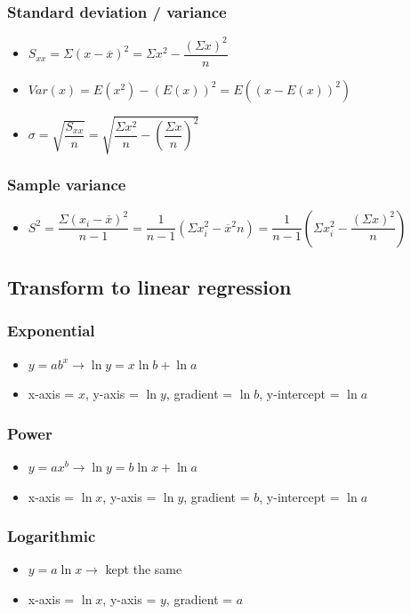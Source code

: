 \documentclass[A4paper, 11pt]{article}
\begin{document}
	\subsubsection{Standard deviation / variance}
	\begin{itemize}
		\item $S_{xx}=\Sigma (x-\overline{x})^2=\Sigma x^2 - \dfrac{(\Sigma x)^2}{n}$
		\item $Var(x)=E(x^2)-(E(x))^2=E((x- E(x) )^2)$
		\item $\sigma=\sqrt{\dfrac{S_{xx}}{n}}=\sqrt{\dfrac{\Sigma x^2}{n} - (\dfrac{\Sigma x}{n})^2}$
	\end{itemize}
	
	\subsubsection{Sample variance}
	\begin{itemize}
		\item $S^2=\dfrac{\Sigma(x_i-\overline{x})^2}{n-1}=\dfrac{1}{n-1}(\Sigma x_i^2-\overline{x}^2n)=\dfrac{1}{n-1}(\Sigma x_i^2-\dfrac{(\Sigma x)^2}{n})$
	\end{itemize}

	
	\subsection{Transform to linear regression}
	\subsubsection{Exponential}
	\begin{itemize}
		\item $y=ab^x\rightarrow\ln y = x\ln b + \ln a$
		\item x-axis = $x$, y-axis = $\ln y$, gradient = $\ln b$, y-intercept = $\ln a$
	\end{itemize}
	\subsubsection{Power}
	\begin{itemize}
		\item $y=ax^b\rightarrow\ln y = b\ln x + \ln a$
		\item x-axis = $\ln x$, y-axis = $\ln y$, gradient = $b$, y-intercept = $\ln a$
	\end{itemize}
	
	\subsubsection{Logarithmic}
	\begin{itemize}
		\item $y=a\ln x\rightarrow$ kept the same
		\item x-axis = $\ln x$, y-axis = $y$, gradient = $a$
	\end{itemize}
	
\end{document}
